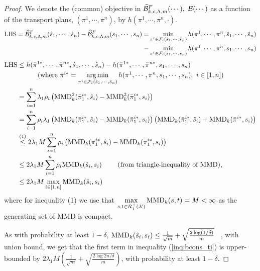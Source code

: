 \begin{proof}
We denote the (common) objective in $\widehat{\mathcal{B}}^F_{k,c,\Lambda, m}(\cdots),\ {\mathcal{B}}(\cdots)$ as a function of the transport plans, $(\pi^1, \cdots, \pi^n)$, by $h(\pi^1, \cdots, \pi^n,\cdot)$.
\begin{align*}
    \textup{LHS}=\widehat{\mathcal{B}}^F_{k,c,\Lambda, m}(\hat{s}_{1}, \cdots, \hat{s}_{n})-\widehat{\mathcal{B}}^F_{k,c,\Lambda, m}(s_1, \cdots, s_n)=&\min\limits_{\pi^i\in \mathcal{F}_i(\hat{s}_{1}, \cdots, \hat{s}_{n})}h(\pi^1, \cdots, \pi^n,\hat{s}_{1}, \cdots, \hat{s}_{n})\\
    -&\min\limits_{\pi^i\in \mathcal{F}_i(\hat{s}_{1}, \cdots, \hat{s}_{n})}h(\pi^1, \cdots, \pi^n, s_1, \cdots, s_n)
\end{align*}
\begin{align*}
\textup{LHS}
    &\le h(\bar{\pi}^{1*}, \cdots, \bar{\pi}^{n*},\hat{s}_{1}, \cdots, \hat{s}_{n}) - h(\bar{\pi}^{1*}, \cdots, \bar{\pi}^{n*}, s_1, \cdots, s_n)\\
    &\quad \tag{where $\bar{\pi}^{i*} = \argmin_{\pi^i\in \calF_i(\hat{s}_{1}, \cdots, \hat{s}_{n})}h(\pi^1, \cdots, \pi^n,s_1, \cdots, s_n),\ i\in [1, n]$}\nonumber\\
    &= \sum_{i=1}^n\lambda_1 \rho_i\left( \MMD_k^2(\bar{\pi}^{i*}_1, \hat{s}_{i}) - \MMD_k^2(\bar{\pi}^{i*}_1, s_i)\right)\\
    &= \sum_{i=1}^n\rho_i\lambda_1 \left(\MMD_k(\bar{\pi}^{i*}_1, \hat{s}_{i}) - \MMD_k(\bar{\pi}^{i*}_1, s_i)\right)\left(\MMD_k(\bar{\pi}^{i*}_1, \hat{s}_{i}) + \MMD_k(\bar{\pi}^{i*}, s_i)\right)\\
    &\stackrel{(1)}{\leq} 2\lambda_1M\sum_{i=1}^n\rho_i\left(\MMD_k(\bar{\pi}^{i*}_1, \hat{s}_{i}) - \MMD_k(\bar{\pi}^{i*}_1, s_i)\right)\\
    &\leq 2\lambda_1M\sum_{i=1}^n\rho_i\MMD_k(\hat{s}_{i}, s_i) \ \tag{from triangle-inequality of MMD},\\
    &\leq 2\lambda_1M\max\limits_{i\in[1, n]}\MMD_k(\hat{s}_{i}, s_i)
\end{align*}
where for inequality (1) we use that $\max\limits_{s,t \in \mathcal{R}^+_1(\mathcal{X})}\textup{MMD}_k(s, t)= M <\infty$ as the generating set of MMD is compact.

As with probability at least $1-\delta$, $\textup{MMD}_k(\hat{s}_{i},s_i)\le\frac{1}{\sqrt{m}}+\sqrt{\frac{2\log({1/\delta})}{m}}$ ~\citep{SmolaGSS07}, with union bound, we get that the first term in inequality (\ref{inq:bcons_ti}) is upper-bounded by $2\lambda_1M\left(\frac{1}{\sqrt{m}}+\sqrt{\frac{2\log{2n/\delta}}{m}}\right)$, with probability at least $1-\delta$.


\end{proof}
